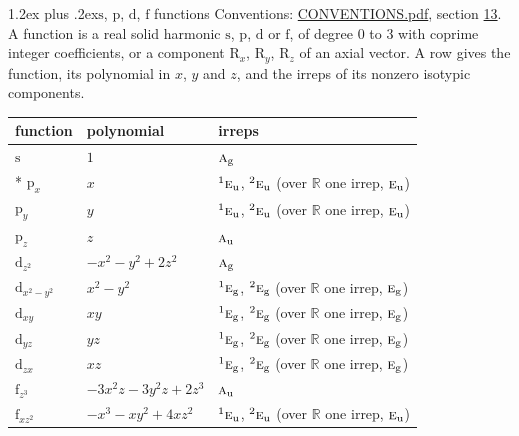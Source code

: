 \documentclass[10pt,a4paper]{article}
\makeatletter
\renewcommand\section{\@startsection{section}{1}{\z@}{-3ex plus -1ex minus -.2ex}%
  {1.2ex plus .2ex}{\normalfont\large\sffamily\bfseries\color{parttitle}}}
\numberwithin{equation}{section}
\newcommand{\irr}[1]{\text{\normalfont\scshape #1}}
\newcommand{\conjpair}[1]{{}^{#1}}
\newcommand{\ptag}[1]{\mathrm{#1}}
\newcommand{\orbital}[1]{\mathrm{#1}}
\makeatother
\begin{document}
\section{\texorpdfstring{$\orbital{s}$, $\orbital{p}$, $\orbital{d}$, $\orbital{f}$}{s, p, d, f} functions}\label{s:orbitals}
Conventions: \href{../../CONVENTIONS.pdf}{CONVENTIONS.pdf}, section \href{../../CONVENTIONS.pdf\#conv.13}{13}.
\leavevmode\label{n:head.function}A function is a real solid harmonic $\orbital{s}$, $\orbital{p}$, $\orbital{d}$ or $\orbital{f}$, of degree 0 to 3 with coprime integer coefficients, or a component $\orbital{R}_{x}$, $\orbital{R}_{y}$, $\orbital{R}_{z}$ of an axial vector. \label{n:head.polynomial}\label{n:head.irreps}A row gives the function, its polynomial in $x$, $y$ and $z$, and the irreps of its nonzero isotypic components.
{\small\begin{longtable}{@{}lll@{}}\toprule
function & polynomial & irreps\\\midrule\endhead
\bottomrule\endfoot\endlastfoot
$\orbital{s}$ & $1$ & $\irr{a}_{\ptag{g}}$\\*
$\orbital{p}_{x}$ & $x$ & $\conjpair{1}\irr{e}_{\ptag{u}}$, $\conjpair{2}\irr{e}_{\ptag{u}}$ (over $\mathbb{R}$ one irrep, $\irr{e}_{\ptag{u}}$)\\
$\orbital{p}_{y}$ & $y$ & $\conjpair{1}\irr{e}_{\ptag{u}}$, $\conjpair{2}\irr{e}_{\ptag{u}}$ (over $\mathbb{R}$ one irrep, $\irr{e}_{\ptag{u}}$)\\
$\orbital{p}_{z}$ & $z$ & $\irr{a}_{\ptag{u}}$\\
$\orbital{d}_{z^2}$ & $-x^{2} - y^{2} + 2z^{2}$ & $\irr{a}_{\ptag{g}}$\\
$\orbital{d}_{x^2-y^2}$ & $x^{2} - y^{2}$ & $\conjpair{1}\irr{e}_{\ptag{g}}$, $\conjpair{2}\irr{e}_{\ptag{g}}$ (over $\mathbb{R}$ one irrep, $\irr{e}_{\ptag{g}}$)\\
$\orbital{d}_{xy}$ & $xy$ & $\conjpair{1}\irr{e}_{\ptag{g}}$, $\conjpair{2}\irr{e}_{\ptag{g}}$ (over $\mathbb{R}$ one irrep, $\irr{e}_{\ptag{g}}$)\\
$\orbital{d}_{yz}$ & $yz$ & $\conjpair{1}\irr{e}_{\ptag{g}}$, $\conjpair{2}\irr{e}_{\ptag{g}}$ (over $\mathbb{R}$ one irrep, $\irr{e}_{\ptag{g}}$)\\
$\orbital{d}_{zx}$ & $xz$ & $\conjpair{1}\irr{e}_{\ptag{g}}$, $\conjpair{2}\irr{e}_{\ptag{g}}$ (over $\mathbb{R}$ one irrep, $\irr{e}_{\ptag{g}}$)\\
$\orbital{f}_{z^3}$ & $-3x^{2}z - 3y^{2}z + 2z^{3}$ & $\irr{a}_{\ptag{u}}$\\
$\orbital{f}_{xz^2}$ & $-x^{3} - xy^{2} + 4xz^{2}$ & $\conjpair{1}\irr{e}_{\ptag{u}}$, $\conjpair{2}\irr{e}_{\ptag{u}}$ (over $\mathbb{R}$ one irrep, $\irr{e}_{\ptag{u}}$)\\

\end{longtable}}
\end{document}
